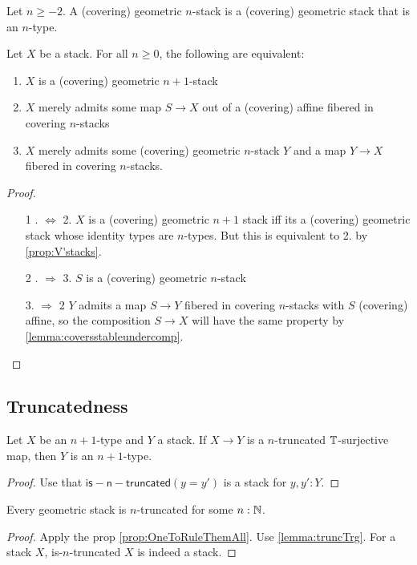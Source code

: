 \begin{definition}
	Let $n \ge -2$. A (covering) geometric $n$-stack is a (covering) geometric stack that is an $n$-type.
\end{definition}
\begin{prop}
	Let $X$ be a stack. For all $n \ge 0$, the following are equivalent:
	\begin{enumerate}
		\item $X$ is a (covering) geometric $n+1$-stack
		\item $X$ merely admits some map $S \to X$ out of a (covering) affine fibered in covering $n$-stacks
		\item $X$ merely admits some (covering) geometric $n$-stack $Y$ and a map $Y \to X$ fibered in covering $n$-stacks.
	\end{enumerate}
\end{prop}
\begin{proof}
	\
	\begin{enumerate}
		\item[1 . $\Leftrightarrow$ 2.]
		$X$ is a (covering) geometric $n+1$ stack iff its a (covering) geometric stack whose identity types are $n$-types. But this is equivalent to 2. by \ref{prop:V'stacks}.
		\item[2 . $\Rightarrow$ 3.]
		$S$ is a (covering) geometric $n$-stack
		\item [3. $\Rightarrow$ 2]
		$Y$ admits a map $S \to Y$  fibered in covering $n$-stacks with $S$ (covering) affine, so the composition $S \to X$ will have the same property by \ref{lemma:coversstableundercomp}.
	\end{enumerate}
\end{proof}

\subsection{Truncatedness}
\begin{lemma}{\label{lemma:truncTrg}}
	Let $X$ be an $n+1$-type and $Y$ a stack. If $X \to Y$ is a $n$-truncated $\mathbb{T}$-surjective map, then $Y$ is an $n+1$-type.
\end{lemma}
\begin{proof}
	Use that $\mathsf{is-n-truncated} (y=y')$ is a stack for $y , y' : Y.$
\end{proof}

\begin{corollary}
	Every geometric stack is $n$-truncated for some $n : \mathbb{N}$.
\end{corollary}
\begin{proof}
	Apply the prop \ref{prop:OneToRuleThemAll}. Use \ref{lemma:truncTrg}. For a stack $X$, is-$n$-truncated $X$ is indeed a stack.
\end{proof}
